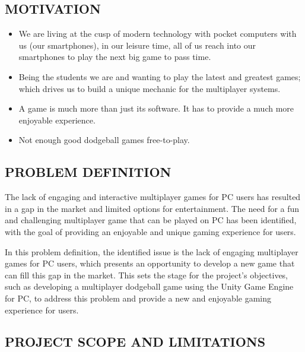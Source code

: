 \documentclass[12pt]{report}
\begin{document}
\raggedright
\subsection{MOTIVATION}

\justifying
\setlength{\parindent}{4em}
\setlength{\parskip}{0.5em}
\renewcommand{\baselinestretch}{1.5}
\normalsize\hspace{1.7cm}\begin{itemize} \item We are living at the cusp of modern technology with pocket computers with us (our smartphones), in our leisure time, all of us reach into our smartphones to play the next big game to pass time.

\item Being the students we are and wanting to play the latest and greatest games; which drives us to build a unique mechanic for the multiplayer systems.

\item A game is much more than just its software. It has to provide a much more enjoyable experience.

\item Not enough good dodgeball games free-to-play.\\
\end{itemize}
\raggedright
\subsection{PROBLEM DEFINITION}

\justifying
\setlength{\parindent}{4em}
\setlength{\parskip}{0.5em}
\renewcommand{\baselinestretch}{1.5}
\normalsize \hspace{1.7cm} The lack of engaging and interactive multiplayer games for PC users has resulted in a gap in the market and limited options for entertainment. The need for a fun and challenging multiplayer game that can be played on PC has been identified, with the goal of providing an enjoyable and unique gaming experience for users.

In this problem definition, the identified issue is the lack of engaging multiplayer games for PC users, which presents an opportunity to develop a new game that can fill this gap in the market. This sets the stage for the project's objectives, such as developing a multiplayer dodgeball game using the Unity Game Engine for PC, to address this problem and provide a new and enjoyable gaming experience for users.
\clearpage
\raggedright
\subsection{PROJECT SCOPE AND LIMITATIONS}
\end{document}
